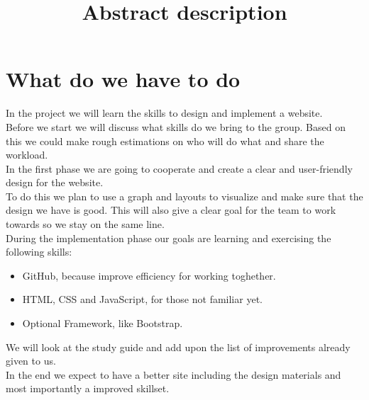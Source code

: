 \documentclass[a4paper,10pt]{article}
\title{Abstract description}
\begin{document}
\maketitle
\section*{What do we have to do}
In the project we will learn the skills to design and implement a website.\\
Before we start we will discuss what skills do we bring to the group. Based on this we could make rough estimations on who will do what and share the workload.\\ 
In the first phase we are going to cooperate and create a clear and user-friendly design for the website.\\
To do this we plan to use a graph and layouts to visualize and make sure that the design we have is good. This will also give a clear goal for the team to work towards so we stay on the same line.\\
During the implementation phase our goals are learning and exercising the following skills:\\
\begin{itemize}
  \item GitHub, because improve efficiency for working toghether.
  \item HTML, CSS and JavaScript, for those not familiar yet.
  \item Optional Framework, like Bootstrap.
\end{itemize}
We will look at the study guide and add upon the list of improvements already given to us.\\
In the end we expect to have a better site including the design materials and most importantly a improved skillset.\\
\end{document}
